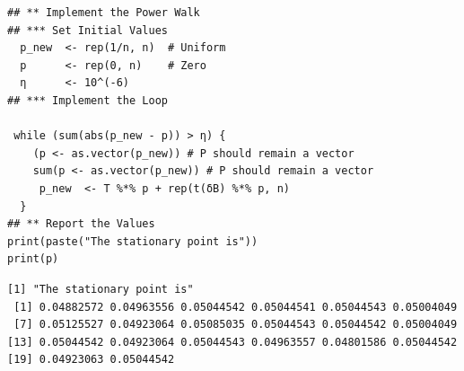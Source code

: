 \documentclass[11pt]{article}
\begin{document}
\begin{enumerate}
\begin{lstlisting}
## ** Implement the Power Walk
## *** Set Initial Values
  p_new  <- rep(1/n, n)  # Uniform
  p      <- rep(0, n)    # Zero
  η      <- 10^(-6)
## *** Implement the Loop

 while (sum(abs(p_new - p)) > η) {
    (p <- as.vector(p_new)) # P should remain a vector
    sum(p <- as.vector(p_new)) # P should remain a vector
     p_new  <- T %*% p + rep(t(δB) %*% p, n)
  }
## ** Report the Values
print(paste("The stationary point is"))
print(p)
\end{lstlisting}

\begin{verbatim}
[1] "The stationary point is"
 [1] 0.04882572 0.04963556 0.05044542 0.05044541 0.05044543 0.05004049
 [7] 0.05125527 0.04923064 0.05085035 0.05044543 0.05044542 0.05004049
[13] 0.05044542 0.04923064 0.05044543 0.04963557 0.04801586 0.05044542
[19] 0.04923063 0.05044542
\end{verbatim}
\end{enumerate}
\end{document}

